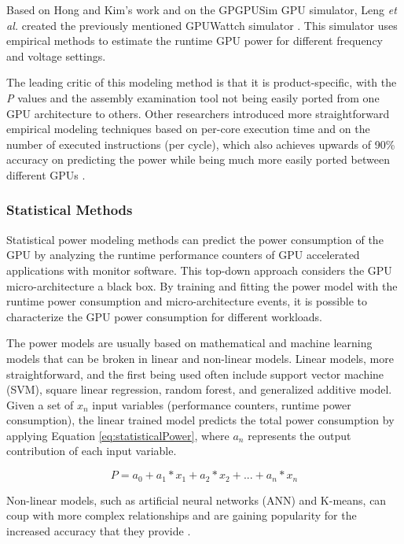 Based on Hong and Kim's work and on the GPGPUSim GPU simulator, Leng \textit{et al.} created the previously mentioned GPUWattch simulator \cite{noauthor_gpu_2011} \cite{leng_gpuwattch:_2013}. This simulator uses empirical methods to estimate the runtime GPU power for different frequency and voltage settings. 

The leading critic of this modeling method is that it is product-specific, with the \textit{P} values and the assembly examination tool not being easily ported from one GPU architecture to others. Other researchers introduced more straightforward empirical modeling techniques based on per-core execution time and on the number of executed instructions (per cycle), which also achieves upwards of 90\% accuracy on predicting the power while being much more easily ported between different GPUs \cite{mei_survey_2016}.

\subsubsection{Statistical Methods}
\label{subsubsection:StatisticalMethods}

Statistical power modeling methods can predict the power consumption of the GPU by analyzing the runtime performance counters of GPU accelerated applications with monitor software. This top-down approach considers the GPU micro-architecture a black box. By training and fitting the power model with the runtime power consumption and micro-architecture events, it is possible to characterize the GPU power consumption for different workloads.

The power models are usually based on mathematical and machine learning models that can be broken in linear and non-linear models. Linear models, more straightforward, and the first being used often include support vector machine (SVM), square linear regression, random forest, and generalized additive model.
Given a set of $x_n$ input variables (performance counters, runtime power consumption), the linear trained model predicts the total power consumption by applying Equation \ref{eq:statisticalPower}, where $a_n$ represents the output contribution of each input variable.

\begin{equation}
\label{eq:statisticalPower}
    P = a_0 + a_1 * x_1 + a_2 * x_2 + ... + a_n * x_n
\end{equation}

Non-linear models, such as artificial neural networks (ANN) and K-means, can coup with more complex relationships and are gaining popularity for the increased accuracy that they provide \cite{mei_survey_2016}. 

